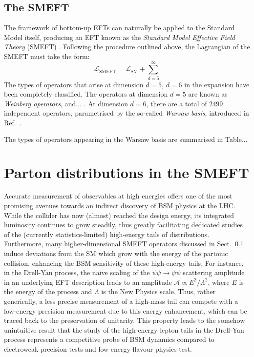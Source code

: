 \documentclass[withindex,glossary]{cam-thesis}
\begin{document}
\subsection{The SMEFT}
\label{subsec:the_smeft}
The framework of bottom-up EFTs can naturally be applied to the Standard Model itself, producing an EFT known as the \textit{Standard Model Effective Field Theory} (SMEFT) \cite{Weinberg:1979sa,Buchmuller:1985jz,Georgi:1994qn,Giudice:2007fh,Grzadkowski:2010es,Alonso:2013hga,Jenkins:2013wua,Jenkins:2013zja,Henning:2014wua,Brivio:2017vri,Wells:2015uba,Englert:2019zmt,Fuentes-Martin:2020udw,Cohen:2020qvb}. Following the procedure outlined above, the Lagrangian of the SMEFT must take the form:
\begin{equation}
\mathcal{L}_{\text{SMEFT}} = \mathcal{L}_{\text{SM}} + \sum_{d=5}^{\infty} 
\end{equation}
The types of operators that arise at dimension $d=5$, $d=6$ in the expansion have been completely classified. The operators at dimension $d=5$ are known as \textit{Weinberg operators}, and... . At dimension $d=6$, there are a total of $2499$ independent operators, parametrised by the so-called \textit{Warsaw basis}, introduced in Ref.~\cite{Grzadkowski:2010es}.

The types of operators appearing in the Warsaw basis are summarised in Table...
 

\section{Parton distributions in the SMEFT}
\label{sec:introduction}
Accurate measurement of observables at high energies offers one of the most promising avenues towards an indirect discovery of BSM physics at the LHC. While the collider has now (almost) reached the design energy, its integrated luminosity continues to grow
steadily, thus greatly facilitating dedicated studies of the
(currently statistics-limited) high-energy tails of distributions. Furthermore, many higher-dimensional SMEFT operators discussed in Sect.~\ref{subsec:the_smeft} induce deviations from the SM which grow
with the energy of the partonic collision, enhancing the BSM sensitivity
of these high-energy tails.
%
For instance, in the Drell-Yan process,  the na\"{\i}ve  scaling of the $\psi \psi \to \psi \psi$ scattering
amplitude in an underlying EFT description leads to an amplitude
$\mathcal{A} \propto E^2 / \Lambda^2$,  where $E$ is the energy of the process and $\Lambda$ is the New Physics scale.
%
Thus, rather generically, a less precise measurement of a high-mass tail can compete with a low-energy precision measurement due to this energy enhancement, which can be traced back to the preservation of unitarity.
%
This property leads to the somehow unintuitive result that
the study of the high-energy lepton tails in the Drell-Yan process represents a competitive probe
of BSM dynamics compared to electroweak precision tests and low-energy
flavour physics test.
\end{document}
